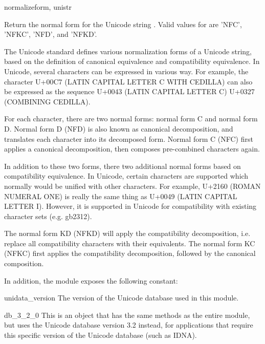 \begin{funcdesc}{normalize}{form, unistr}

Return the normal form  for the Unicode string .
Valid values for  are 'NFC', 'NFKC', 'NFD', and 'NFKD'.

The Unicode standard defines various normalization forms of a Unicode
string, based on the definition of canonical equivalence and
compatibility equivalence. In Unicode, several characters can be
expressed in various way. For example, the character U+00C7 (LATIN
CAPITAL LETTER C WITH CEDILLA) can also be expressed as the sequence
U+0043 (LATIN CAPITAL LETTER C) U+0327 (COMBINING CEDILLA).

For each character, there are two normal forms: normal form C and
normal form D. Normal form D (NFD) is also known as canonical
decomposition, and translates each character into its decomposed form.
Normal form C (NFC) first applies a canonical decomposition, then
composes pre-combined characters again.

In addition to these two forms, there two additional normal forms
based on compatibility equivalence. In Unicode, certain characters are
supported which normally would be unified with other characters. For
example, U+2160 (ROMAN NUMERAL ONE) is really the same thing as U+0049
(LATIN CAPITAL LETTER I). However, it is supported in Unicode for
compatibility with existing character sets (e.g. gb2312).

The normal form KD (NFKD) will apply the compatibility decomposition,
i.e. replace all compatibility characters with their equivalents. The
normal form KC (NFKC) first applies the compatibility decomposition,
followed by the canonical composition.

\end{funcdesc}

In addition, the module exposes the following constant:

\begin{datadesc}{unidata_version}
The version of the Unicode database used in this module.

\end{datadesc}

\begin{datadesc}{db_3_2_0}
This is an object that has the same methods as the entire
module, but uses the Unicode database version 3.2 instead,
for applications that require this specific version of
the Unicode database (such as IDNA).

\end{datadesc}
